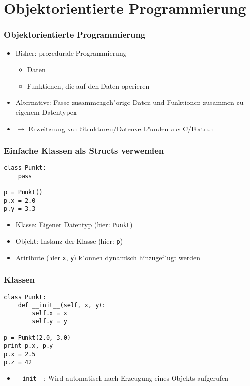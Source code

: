 \section{Objektorientierte Programmierung}

\begin{frame}
\frametitle{Objektorientierte Programmierung}
\begin{itemize}
\item Bisher: prozedurale Programmierung
\begin{itemize}
\item Daten
\item Funktionen, die auf den Daten operieren
\end{itemize}
\item Alternative: Fasse zusammengeh"orige Daten und Funktionen zusammen zu \alert{eigenem Datentypen}
\item $\rightarrow$ Erweiterung von Strukturen/Datenverb"unden aus C/Fortran
\end{itemize}
\end{frame}

\begin{frame}[fragile]
\frametitle{Einfache Klassen als Structs verwenden}
\begin{lstlisting}[style=Python]
class Punkt:
    pass

p = Punkt()
p.x = 2.0
p.y = 3.3
\end{lstlisting}
\begin{itemize}
\item \alert{Klasse}: Eigener Datentyp (hier: \texttt{Punkt})
\item \alert{Objekt}: Instanz der Klasse (hier: \texttt{p})
\item Attribute (hier \texttt{x}, \texttt{y})  k"onnen dynamisch hinzugef"ugt werden
\end{itemize}
\end{frame}

\begin{frame}[fragile]
\frametitle{Klassen}
\begin{lstlisting}[style=Python]
class Punkt:
    def __init__(self, x, y):
        self.x = x
        self.y = y

p = Punkt(2.0, 3.0)
print p.x, p.y
p.x = 2.5
p.z = 42
\end{lstlisting}
\begin{itemize}
\item \texttt{\_\_init\_\_}: Wird automatisch nach Erzeugung eines Objekts aufgerufen
\end{itemize}
\end{frame}

